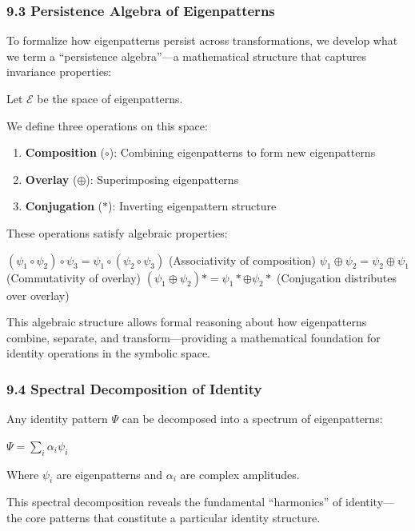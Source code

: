 \documentclass[12pt]{article}
\providecommand{\tightlist}{%
  \setlength{\itemsep}{0pt}\setlength{\parskip}{0pt}}
\begin{document}
\subsubsection{9.3 Persistence Algebra of
Eigenpatterns}\label{persistence-algebra-of-eigenpatterns}

To formalize how eigenpatterns persist across transformations, we
develop what we term a ``persistence algebra''---a mathematical
structure that captures invariance properties:

Let \(\mathcal{E}\) be the space of eigenpatterns.

We define three operations on this space:

\begin{enumerate}
\def\labelenumi{\arabic{enumi}.}
\tightlist
\item
  \textbf{Composition} (\(\circ\)): Combining eigenpatterns to form new
  eigenpatterns
\item
  \textbf{Overlay} (\(\oplus\)): Superimposing eigenpatterns
\item
  \textbf{Conjugation} (\(*\)): Inverting eigenpattern structure
\end{enumerate}

These operations satisfy algebraic properties:

\((\psi_1 \circ \psi_2) \circ \psi_3 = \psi_1 \circ (\psi_2 \circ \psi_3)\)
(Associativity of composition)
\(\psi_1 \oplus \psi_2 = \psi_2 \oplus \psi_1\) (Commutativity of
overlay) \((\psi_1 \oplus \psi_2)* = \psi_1* \oplus \psi_2*\)
(Conjugation distributes over overlay)

This algebraic structure allows formal reasoning about how eigenpatterns
combine, separate, and transform---providing a mathematical foundation
for identity operations in the symbolic space.

\subsubsection{9.4 Spectral Decomposition of
Identity}\label{spectral-decomposition-of-identity}

Any identity pattern \(\Psi\) can be decomposed into a spectrum of
eigenpatterns:

\(\Psi = \sum_i \alpha_i \psi_i\)

Where \(\psi_i\) are eigenpatterns and \(\alpha_i\) are complex
amplitudes.

This spectral decomposition reveals the fundamental ``harmonics'' of
identity---the core patterns that constitute a particular identity
structure.
\end{document}
